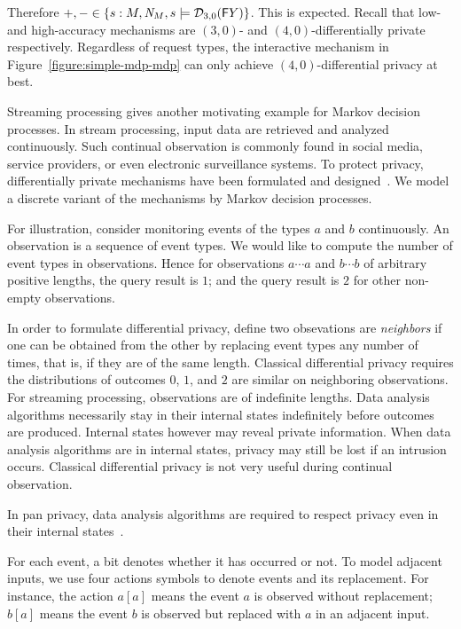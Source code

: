 Therefore $+, - \in \{ s : M, \mathit{N}_{M}, s \models \mathcal{D}_{{3}, {0}}
(\mathsf{F} Y) \}$. This is expected. Recall that low- and high-accuracy
mechanisms are $(3, 0)$- and $(4, 0)$-differentially private
respectively. Regardless of request types, the interactive mechanism
in Figure~\ref{figure:simple-mdp-mdp} can only achieve $(4,
0)$-differential privacy at best.


Streaming processing gives another motivating example for Markov
decision processes. In stream processing, input data are retrieved and
analyzed continuously. Such continual observation is commonly found
in social media, service providers, or even electronic surveillance
systems. To protect privacy, differentially private mechanisms have
been formulated and designed~\cite{DNPR:10:DPCO,DNPRY:10:PPSA}. 
We model a discrete variant of the mechanisms by Markov decision processes.

For illustration, consider monitoring events of the types $a$ and $b$
continuously. An observation is a sequence of event types. We would
like to compute the number of event types in observations. Hence for
observations $a \cdots a$ and $b \cdots b$ of arbitrary positive
lengths, the query result is $1$; and the query result is $2$ for
other non-empty observations. 

In order to formulate differential privacy, define two obsevations
are \emph{neighbors} if one can be obtained from the other by replacing
event types any number of times, that is, if they are of the same
length.  Classical
differential privacy requires the distributions of outcomes $0$,
$1$, and $2$ are similar on neighboring observations. For streaming
processing, observations are of indefinite lengths. Data analysis
algorithms necessarily stay in their internal states indefinitely
before outcomes are produced. Internal states however may reveal
private information. When data analysis algorithms are in internal
states, privacy may still be lost if an intrusion occurs. Classical
differential privacy is not very useful during continual observation.

In pan privacy, data analysis algorithms are required to respect
privacy even in their internal states~\cite{DNPR:10:DPCO,DNPRY:10:PPSA}. 


For each event, a bit denotes whether it has occurred or not. To model
adjacent inputs, we use four actions symbols to denote events and its
replacement. For instance, the action $a[a]$ means the event $a$ is
observed without replacement; $b[a]$ means the event $b$ is observed
but replaced with $a$ in an adjacent input. 

